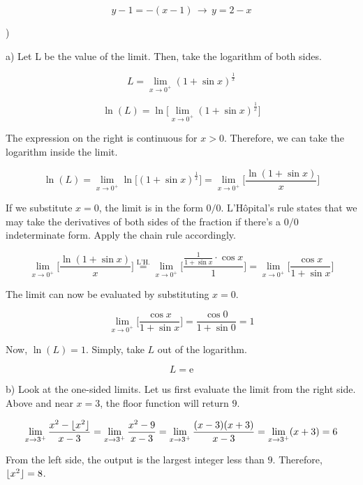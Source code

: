 \documentclass{article}
\DeclarePairedDelimiter\floor{\lfloor}{\rfloor}
\begin{document}
\[ y-1 = -(x-1) \,\rightarrow\, \boxed{y=2-x}\]

\hfill

)

\hfill

\noindent a) Let L be the value of the limit. Then, take the logarithm of both sides.

\[L = \lim_{x\to 0^+} (1+\sin x)^{\frac{1}{x}}\]

\[\ln(L) = \ln\Big[\lim_{x\to 0^+} (1+\sin x)^{\frac{1}{x}}\Big]\]

\hfill

\noindent The expression on the right is continuous for $x>0$. Therefore, we can take the logarithm inside the limit.

\[\ln(L) = \lim_{x\to 0^+} \ln\Big[(1+\sin x)^{\frac{1}{x}}\Big] = \lim_{x\to 0^+} \Big[\frac{\ln(1+\sin x)}{x}\Big] \]

\hfill

\noindent If we substitute $x=0$, the limit is in the form $0/0$. L'Hôpital's rule states that we may take the derivatives of both sides of the fraction if there's a $0/0$ indeterminate form. Apply the chain rule accordingly.

\[\lim_{x\to 0^+} \Big[\frac{\ln(1+\sin x)}{x}\Big] \overset{\text{L'H.}}{=} \lim_{x\to 0^+} \Big[\frac{\frac{1}{1+\sin x} \cdot \cos x}{1}\Big] = \lim_{x\to 0^+} \Big[\frac{\cos x}{1+\sin x}\Big] \]

\hfill

\noindent The limit can now be evaluated by substituting $x=0$.

\[\lim_{x\to 0^+} \Big[\frac{\cos x}{1+\sin x}\Big] = \frac{\cos 0}{1 + \sin 0 } =1\]

\hfill

\noindent Now, $\ln(L) = 1$. Simply, take $L$ out of the logarithm.

\[ \boxed{L = \mathrm{e}}\]

\hfill

\noindent b) Look at the one-sided limits. Let us first evaluate the limit from the right side. Above and near $x=3$, the floor function will return $9$.

\[ \lim_{x\to 3^+} \frac{x^2-\floor{x^2}}{x-3} = \lim_{x\to 3^+}\frac{x^2-9}{x-3} = \lim_{x\to 3^+}\frac{(x-3)(x+3)}{x-3} = \lim_{x\to 3^+}(x+3)= 6\]

\hfill

\noindent From the left side, the output is the largest integer less than $9$. Therefore, $\floor{x^2} = 8$.
\end{document}
